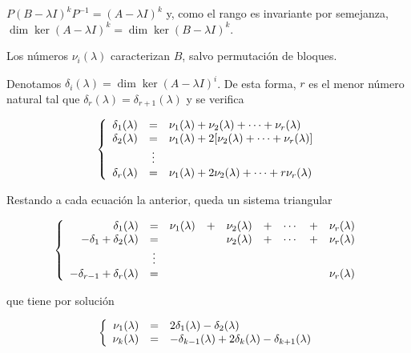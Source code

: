 \documentclass[../main.tex]{subfiles}
\begin{document}
  \begin{remark}
    \(P(B - \lambda I)^kP^{-1} = (A - \lambda I)^k\) y, como el rango es
    invariante por semejanza, \(\dim \ker (A - \lambda I)^k = \dim \ker (B -
    \lambda I)^k\).
  \end{remark}

  \begin{remark}
    Los números \(\nu_i(\lambda)\) caracterizan \(B\), salvo permutación de bloques.
  \end{remark}
  
  Denotamos \(\delta_i(\lambda) = \dim \ker (A - \lambda I)^i\). De esta forma,
  \(r\) es el menor número natural tal que \(\delta_r(\lambda) =
  \delta_{r+1}(\lambda)\) y se verifica

  \[\left\{
      \begin{array}[ht]{r c l}
        \delta_1(\lambda) & = & \nu_1(\lambda) + \nu_2(\lambda) + \cdots +
                            \nu_r(\lambda) \\
        \delta_2(\lambda) & = & \nu_1(\lambda) + 2[\nu_2(\lambda) + \cdots +
                            \nu_r(\lambda)] \\
        & \vdots & \\
        \delta_r(\lambda) & = & \nu_1(\lambda) + 2\nu_2(\lambda) + \cdots + r\nu_r(\lambda)
      \end{array}
      \right.
    \]

    Restando a cada ecuación la anterior, queda un sistema triangular

  \[\left\{
      \begin{array}[ht]{r c c c c c c c c}
        \delta_1(\lambda) & = & \nu_1(\lambda) & + & \nu_2(\lambda) & + & \cdots & + & \nu_r(\lambda) \\
        -\delta_1 + \delta_2(\lambda) & = & & & \nu_2(\lambda) & + & \cdots & + & \nu_r(\lambda) \\
        & \vdots & \\
        -\delta_{r-1} + \delta_r(\lambda) & = & & & & & & & \nu_r(\lambda)
      \end{array}
      \right.
    \]

    que tiene por solución

    \[\left\{
        \begin{array}[ht]{r c l}
          \nu_1(\lambda) & = & 2\delta_1(\lambda) - \delta_2(\lambda) \\
          \nu_k(\lambda) & = & -\delta_{k-1}(\lambda) + 2\delta_k(\lambda) - \delta_{k+1}(\lambda)
        \end{array}
      \right.
    \]
\end{document}
